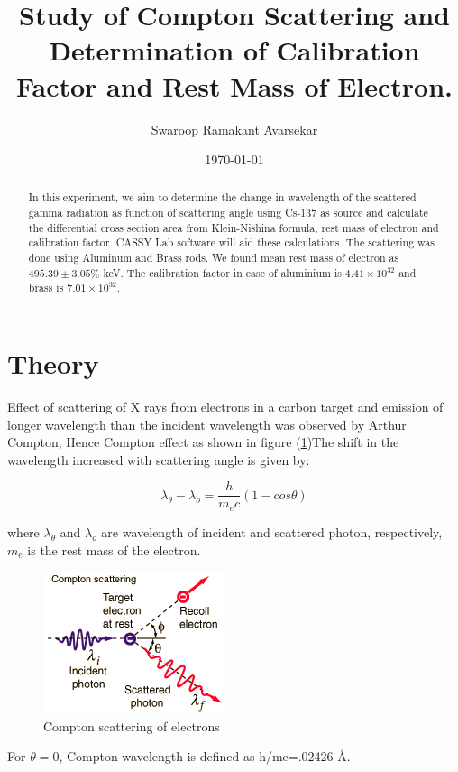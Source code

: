 \documentclass[a4paper, amsfonts, amssymb, amsmath, reprint, showkeys, nofootinbib, twoside]{revtex4-1}
\begin{document}
\title{Study of Compton Scattering and Determination of Calibration Factor and Rest Mass of Electron.}
\author{Swaroop Ramakant Avarsekar}
\date{\today}


\begin{abstract}
In this experiment, we aim to determine the change in wavelength of the scattered gamma radiation as function of scattering angle using Cs-137 as source and calculate the differential cross section area from Klein-Nishina formula, rest mass of electron and calibration factor. CASSY Lab software will aid these calculations. The scattering was done using Aluminum and Brass rods. We found mean rest mass of electron as $495.39\pm3.05\%$ keV. The calibration factor in case of aluminium is $4.41\times10^{32}$ and brass is $7.01\times10^{32}$.
\end{abstract}
	

\maketitle

\section{Theory}
Effect of scattering of X rays from electrons in a carbon target and emission of longer wavelength than the incident wavelength was observed by Arthur Compton, Hence Compton effect as shown in figure (\ref{1})The shift in the wavelength increased with scattering angle is given by:

\begin{equation}\label{e1}
	\lambda_\theta-\lambda_o=\frac{h}{m_ec}(1-cos\theta)
\end{equation}

where $\lambda_\theta$ and $\lambda_o$ are wavelength of incident and scattered photon, respectively, $m_e$ is the rest mass of the electron.

\begin{figure}[H]
	\centering
	\includegraphics[scale=0.8]{1} 
	\caption{Compton scattering of electrons}
	\label{1}
\end{figure}
For $\theta=0$, Compton wavelength is defined as h/me=.02426 \AA. 
\end{document}
